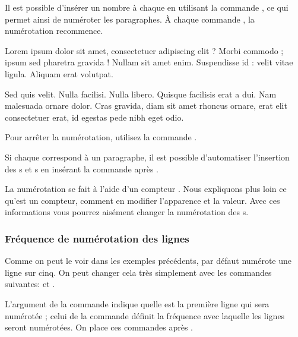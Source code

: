 Il est possible d'insérer un nombre à chaque  en utilisant la commande \label{numberpstarttrue}, ce qui permet ainsi de numéroter les paragraphes. À chaque commande , la numérotation recommence.

\begin{minipage}{0.8\textwidth}
\numberpstarttrue
\beginnumbering
\pstart 
Lorem ipsum dolor sit amet, consectetuer adipiscing elit ?
Morbi commodo ; ipsum sed pharetra gravida !
Nullam sit amet enim. Suspendisse id : velit vitae ligula. 
Aliquam erat volutpat. \pend


\pstart Sed quis velit. Nulla facilisi. Nulla libero. 
 Quisque facilisis erat a dui.
Nam malesuada ornare dolor.
Cras gravida, diam sit amet rhoncus ornare, 
erat  elit consectetuer erat, id egestas pede nibh eget odio.
\pend
\endnumbering
\end{minipage}

Pour arrêter la numérotation,  utilisez la commande .

\begin{plusloins}
Si chaque  correspond à un paragraphe, il est possible d'automatiser l'insertion des s et s en insérant la commande  après .
\end{plusloins}

\begin{plusloins}
La numérotation se fait à l'aide d'un compteur . Nous expliquons plus loin ce qu'est un compteur, comment en modifier l'apparence et la valeur. Avec ces informations vous pourrez aisément changer la numérotation des s.
\end{plusloins}

\subsubsection{Fréquence de numérotation des lignes}

Comme on peut le voir dans les exemples précédents, par défaut  numérote  une ligne sur cinq. On peut changer cela très simplement avec les commandes suivantes:
 et .

L'argument  de la commande  indique quelle est  la première ligne qui sera numérotée 
; celui de la commande  définit la fréquence avec laquelle les lignes seront numérotées. On place ces commandes après . 

